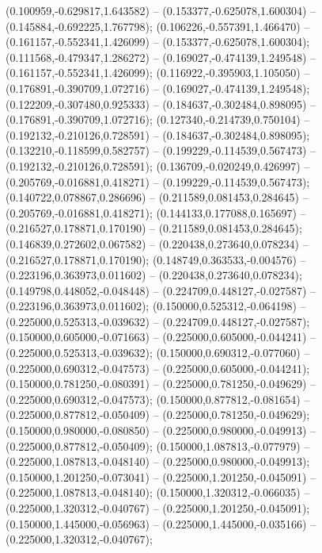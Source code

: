  (0.100959,-0.629817,1.643582) -- (0.153377,-0.625078,1.600304) -- (0.145884,-0.692225,1.767798);
 (0.106226,-0.557391,1.466470) -- (0.161157,-0.552341,1.426099) -- (0.153377,-0.625078,1.600304);
 (0.111568,-0.479347,1.286272) -- (0.169027,-0.474139,1.249548) -- (0.161157,-0.552341,1.426099);
 (0.116922,-0.395903,1.105050) -- (0.176891,-0.390709,1.072716) -- (0.169027,-0.474139,1.249548);
 (0.122209,-0.307480,0.925333) -- (0.184637,-0.302484,0.898095) -- (0.176891,-0.390709,1.072716);
 (0.127340,-0.214739,0.750104) -- (0.192132,-0.210126,0.728591) -- (0.184637,-0.302484,0.898095);
 (0.132210,-0.118599,0.582757) -- (0.199229,-0.114539,0.567473) -- (0.192132,-0.210126,0.728591);
 (0.136709,-0.020249,0.426997) -- (0.205769,-0.016881,0.418271) -- (0.199229,-0.114539,0.567473);
 (0.140722,0.078867,0.286696) -- (0.211589,0.081453,0.284645) -- (0.205769,-0.016881,0.418271);
 (0.144133,0.177088,0.165697) -- (0.216527,0.178871,0.170190) -- (0.211589,0.081453,0.284645);
 (0.146839,0.272602,0.067582) -- (0.220438,0.273640,0.078234) -- (0.216527,0.178871,0.170190);
 (0.148749,0.363533,-0.004576) -- (0.223196,0.363973,0.011602) -- (0.220438,0.273640,0.078234);
 (0.149798,0.448052,-0.048448) -- (0.224709,0.448127,-0.027587) -- (0.223196,0.363973,0.011602);
 (0.150000,0.525312,-0.064198) -- (0.225000,0.525313,-0.039632) -- (0.224709,0.448127,-0.027587);
 (0.150000,0.605000,-0.071663) -- (0.225000,0.605000,-0.044241) -- (0.225000,0.525313,-0.039632);
 (0.150000,0.690312,-0.077060) -- (0.225000,0.690312,-0.047573) -- (0.225000,0.605000,-0.044241);
 (0.150000,0.781250,-0.080391) -- (0.225000,0.781250,-0.049629) -- (0.225000,0.690312,-0.047573);
 (0.150000,0.877812,-0.081654) -- (0.225000,0.877812,-0.050409) -- (0.225000,0.781250,-0.049629);
 (0.150000,0.980000,-0.080850) -- (0.225000,0.980000,-0.049913) -- (0.225000,0.877812,-0.050409);
 (0.150000,1.087813,-0.077979) -- (0.225000,1.087813,-0.048140) -- (0.225000,0.980000,-0.049913);
 (0.150000,1.201250,-0.073041) -- (0.225000,1.201250,-0.045091) -- (0.225000,1.087813,-0.048140);
 (0.150000,1.320312,-0.066035) -- (0.225000,1.320312,-0.040767) -- (0.225000,1.201250,-0.045091);
 (0.150000,1.445000,-0.056963) -- (0.225000,1.445000,-0.035166) -- (0.225000,1.320312,-0.040767);
